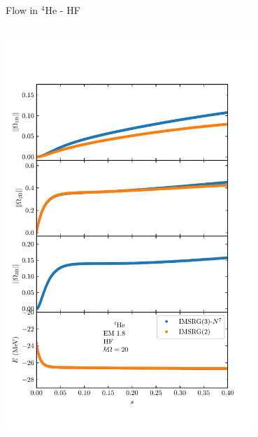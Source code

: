 \documentclass[aspectratio=169]{beamer}
\newcommand{\backupend}{
   \setcounter{framenumber}{\value{finalframe}}
}
\begin{document}
\begin{frame}{Flow in ${}^{4}\text{He}$ - HF}
\begin{columns}
\begin{column}{0.5\textwidth}
\begin{center}
        \includegraphics[trim=0 1.0cm 0 1.5cm, clip, width=0.7\textwidth]{thesis/talk/images/helium_flow_imsrg2_and_3_omega.pdf}
      \end{center}
    \end{column}

  \end{columns}
\end{frame}

\backupend
\end{document}
